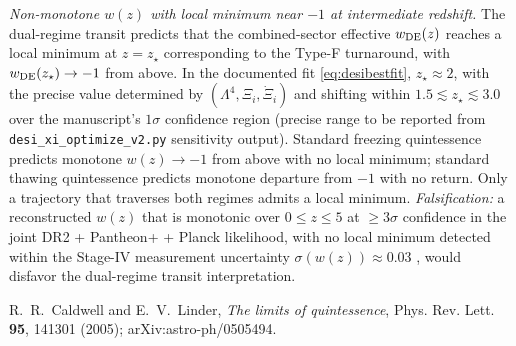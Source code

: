 
  \item[(F$_5$)] \emph{Non-monotone $w(z)$ with local minimum near $-1$
        at intermediate redshift.}
        The dual-regime transit predicts that the combined-sector
        effective $w_{\rm DE}(z)$ reaches a local minimum at $z = z_\star$
        corresponding to the Type-F turnaround, with $w_{\rm DE}(z_\star)
        \to -1$ from above. In the documented fit \eqref{eq:desibestfit},
        $z_\star \approx 2$, with the precise value determined by
        $(\Lambda^4, \Xi_i, \dot\Xi_i)$ and shifting within
        $1.5 \lesssim z_\star \lesssim 3.0$ over the manuscript's $1\sigma$
        confidence region (precise range to be reported from
        \texttt{desi\_xi\_optimize\_v2.py} sensitivity output). Standard
        freezing quintessence predicts monotone $w(z) \to -1$ from above
        with no local minimum; standard thawing quintessence predicts
        monotone departure from $-1$ with no return. Only a trajectory
        that traverses both regimes admits a local minimum.
        \emph{Falsification:} a reconstructed $w(z)$ that is monotonic
        over $0 \leq z \leq 5$ at $\geq 3\sigma$ confidence in the joint
        DR2 + Pantheon+ + Planck likelihood, with no local minimum
        detected within the Stage-IV measurement uncertainty
        $\sigma(w(z)) \approx 0.03$ \cite{ShajibFrieman2025}, would
        disfavor the dual-regime transit interpretation.



R.~R.~Caldwell and E.~V.~Linder,
\emph{The limits of quintessence},
Phys. Rev. Lett. \textbf{95}, 141301 (2005); arXiv:astro-ph/0505494.

